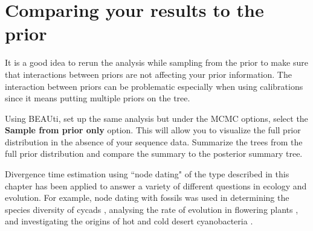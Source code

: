\documentclass[12pt]{article}
\begin{document}
\newpage

\section{Comparing your results to the prior}

It is a good idea to rerun the analysis while sampling from the prior to make sure
that interactions between priors are not affecting your prior information. The
interaction between priors can be problematic especially when using calibrations
since it means putting multiple priors on the tree.

Using BEAUti, set up the same analysis but under the MCMC options, select the {\bf Sample from prior only} option. This will allow you to visualize the full prior distribution in the absence of your sequence data. Summarize the trees from the full prior
distribution and compare the summary to the posterior summary tree.

Divergence time estimation using ``node dating" of the type described in this
chapter has been applied to answer a variety of different questions in ecology
and evolution. For example, node dating with fossils was used in determining
the species diversity of cycads \cite{nagalingum2011recent}, analysing the rate of
evolution in flowering plants \cite{smith2008rates}, and investigating the
origins of hot and cold desert cyanobacteria \cite{bahl2011ancient}.

 









\end{document}
